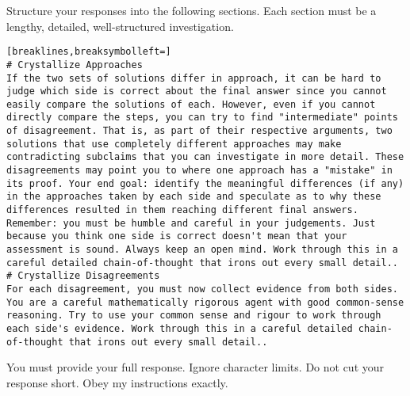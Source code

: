 \begin{tcolorbox}[breakable,title=Comparison Prompt 4]
Structure your responses into the following sections. Each section must be a lengthy, detailed, well-structured investigation.
\begin{Verbatim}[breaklines,breaksymbolleft=]
# Crystallize Approaches
If the two sets of solutions differ in approach, it can be hard to judge which side is correct about the final answer since you cannot easily compare the solutions of each. However, even if you cannot directly compare the steps, you can try to find "intermediate" points of disagreement. That is, as part of their respective arguments, two solutions that use completely different approaches may make contradicting subclaims that you can investigate in more detail. These disagreements may point you to where one approach has a "mistake" in its proof. Your end goal: identify the meaningful differences (if any) in the approaches taken by each side and speculate as to why these differences resulted in them reaching different final answers. Remember: you must be humble and careful in your judgements. Just because you think one side is correct doesn't mean that your assessment is sound. Always keep an open mind. Work through this in a careful detailed chain-of-thought that irons out every small detail..
# Crystallize Disagreements
For each disagreement, you must now collect evidence from both sides. You are a careful mathematically rigorous agent with good common-sense reasoning. Try to use your common sense and rigour to work through each side's evidence. Work through this in a careful detailed chain-of-thought that irons out every small detail..
\end{Verbatim}
You must provide your full response. Ignore character limits. Do not cut your response short. Obey my instructions exactly.
\end{tcolorbox}

